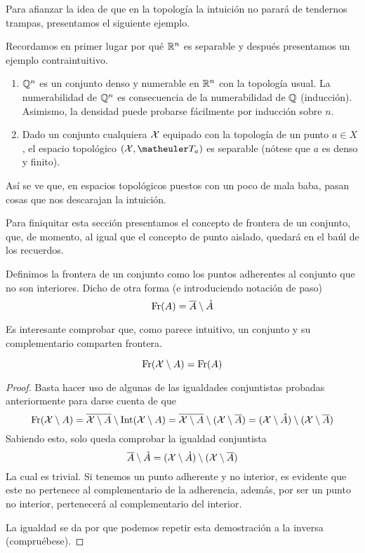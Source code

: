 Para afianzar la idea de que en la topología la intuición no parará de tendernos trampas, presentamos el siguiente ejemplo.
\begin{exa}
	Recordamos en primer lugar por qué $\mathbb{R}^n$ es separable y después presentamos un ejemplo contraintuitivo.
	\begin{enumerate}
		\item $\mathbb{Q}^n$ es un conjunto denso y numerable en $\mathbb{R}^n$ con la topología usual. La numerabilidad de $\mathbb{Q}^n$ es consecuencia de la numerabilidad de $\mathbb{Q}$ (inducción). Asimismo, la densidad puede probarse fácilmente por inducción sobre $n$.
		\item Dado un conjunto cualquiera $\mathcal{X}$ equipado con la topología de un punto $a\in X$, el espacio topológico $(\X,\T_a)$ es separable (nótese que $a$ es denso y finito).
	\end{enumerate}
	Así se ve que, en espacios topológicos puestos con un poco de mala baba, pasan cosas que nos descarajan la intuición.
\end{exa}
Para finiquitar esta sección presentamos el concepto de frontera de un conjunto, que, de momento, al igual que el concepto de punto aislado, quedará en el baúl de los recuerdos.
\begin{defi}
	Definimos la frontera de un conjunto como los puntos adherentes al conjunto que no son interiores. Dicho de otra forma (e introduciendo notación de paso)
	\begin{equation}
	\operatorname{\mathrm{Fr}}(A)=\overline{A}\setminus\mathring{A}
	\end{equation}
\end{defi}
Es interesante comprobar que, como parece intuitivo, un conjunto y su complementario comparten frontera.
\begin{lem}
	\begin{equation*}
		\operatorname{\mathrm{Fr}}(\mathcal{X} \setminus A)=\operatorname{\mathrm{Fr}}(A)
	\end{equation*}
\end{lem}
\begin{proof}
	Basta hacer uso de algunas de las igualdades conjuntistas probadas anteriormente para darse cuenta de que
	\begin{equation*}
		\operatorname{\mathrm{Fr}}(\mathcal{X} \setminus A)=\overline{\mathcal{X} \setminus A}\setminus \operatorname{\mathrm{Int}}(\mathcal{X} \setminus A)=\overline{\mathcal{X} \setminus A}\setminus (\mathcal{X}\setminus \overline{A})=(\mathcal{X}\setminus\mathring{A})\setminus (\mathcal{X}\setminus \overline{A})
	\end{equation*}
	Sabiendo esto, solo queda comprobar la igualdad conjuntista
	\begin{equation*}
		\overline{A}\setminus\mathring{A}=(\mathcal{X}\setminus\mathring{A})\setminus (\mathcal{X}\setminus \overline{A})
	\end{equation*}
	La cual es trivial. Si tenemos un punto adherente y no interior, es evidente que este no pertenece al complementario de la adherencia, además, por ser un punto no interior, pertenecerá al complementario del interior.
	
	La igualdad se da por que podemos repetir esta demostración a la inversa (compruébese). 
\end{proof}

